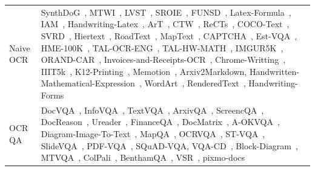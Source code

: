 \begin{table}[!tbp]
{\begin{tabular}{m{1.6cm}|>{\small}m{15.4cm}}
Naive OCR & SynthDoG~\cite{kim2022synthdog}, MTWI~\cite{he2018icpr2018_MTWI}, LVST~\cite{sun2019lsvt}, SROIE~\cite{huang2019icdar_sroie}, FUNSD~\cite{jaume2019funsd}, Latex-Formula~\cite{oleehyo_latex_formulas}, IAM~\cite{marti2002iam}, Handwriting-Latex~\cite{aida}, ArT~\cite{chng2019art}, CTW~\cite{yuan2019ctw}, ReCTs~\cite{zhang2019rects}, COCO-Text~\cite{veit2016cocotext}, SVRD~\cite{yu2023icdar_svrd}, Hiertext~\cite{long2023icdar_hiertext}, RoadText~\cite{tom2023icdar_roadtext}, MapText~\cite{li2024icdar_maptext}, CAPTCHA~\cite{captcha}, Est-VQA~\cite{wang2020estvqa}, HME-100K~\cite{tal}, TAL-OCR-ENG~\cite{tal}, TAL-HW-MATH~\cite{tal}, IMGUR5K~\cite{krishnan2023textstylebrush_Imgur5K}, ORAND-CAR~\cite{diem2014icfhr_RAND_CAR}, Invoices-and-Receipts-OCR~\cite{mychen76_invoices_receipts_ocr_v1},  Chrome-Writting~\cite{mouchere2016icfhr2016_chrome_writing}, IIIT5k~\cite{mishra2012scene_iiit5k}, K12-Printing~\cite{tal}, Memotion~\cite{ramamoorthy2022memotion}, Arxiv2Markdown, Handwritten-Mathematical-Expression~\cite{Azu}, WordArt~\cite{xie2022toward_wordart}, 
RenderedText~\cite{wendlerc_renderedtext}, Handwriting-Forms~\cite{ift_handwriting_forms}\\

\footnotesize 
OCR QA &  DocVQA~\cite{clark2017docqa}, InfoVQA~\cite{mathew2022infographicvqa}, TextVQA~\cite{singh2019textvqa}, ArxivQA~\cite{li2024multimodal_arxivQA},
ScreencQA~\cite{hsiao2022screenqa}, DocReason~\cite{mplug_docreason25k}, Ureader~\cite{ye2023ureader}, FinanceQA~\cite{Sujet-Finance-QA-Vision-100k}, DocMatrix~\cite{laurenccon2024building_docmatrix}, A-OKVQA~\cite{schwenk2022aokvqa}, Diagram-Image-To-Text~\cite{kamizuru00_diagram_image_to_text}, MapQA~\cite{chang2022mapqa}, OCRVQA~\cite{mishra2019ocrvqa}, ST-VQA~\cite{biten2019stvqa}, SlideVQA~\cite{tanaka2023slidevqa}, PDF-VQA~\cite{ding2023PDFvqa}, SQuAD-VQA, VQA-CD~\cite{mahamoud2024chic_vqa_cd}, Block-Diagram~\cite{shreyanshu09_block_diagram}, MTVQA~\cite{tang2024mtvqa}, ColPali~\cite{faysse2024colpali}, BenthamQA~\cite{mathew2021asking_benthamqa}, VSR~\cite{zhang2021vsr}, pixmo-docs~\cite{deitke2025molmo}\\


\end{tabular}}
\end{table}
